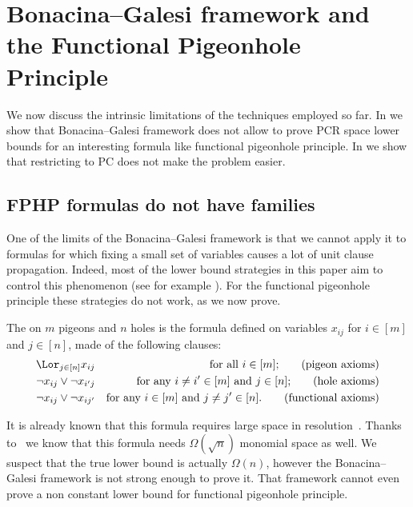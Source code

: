 \section{Bonacina--Galesi framework and the Functional Pigeonhole Principle}
\label{sec:limitations}

  We now discuss the intrinsic limitations of the techniques employed
  so far. In  we show that
  Bonacina--Galesi framework does not allow to prove PCR space lower
  bounds for an interesting formula like functional pigeonhole
  principle. In  we show that
  restricting to PC does not make the problem easier.

\subsection{FPHP formulas do not have \KextendibleNok families}
\label{sec:fphp-no-kextendible}

One of the limits of the Bonacina--Galesi framework is that we cannot
apply it to formulas for which fixing a small set of variables causes
a lot of unit clause propagation. Indeed, most of the lower bound
strategies in this paper aim to control this phenomenon (see for
example ). For the functional pigeonhole
principle these strategies do not work, as we now prove.


\begin{definition}\label{def:fphpformula}
  The  on $m$ pigeons and $n$ holes is the formula defined on variables $x_{ij}$ for $i\in[m]$ and $j\in[n]$, made of the following clauses:
  \begin{align}
    \Lor_{j\in[n]} x_{ij} && \text{for all $i\in[m]$;} \tag{pigeon axioms}\\
    \lnot{x_{ij}} \lor \lnot{x_{i'j}} && \text{for any
      $i\not=i'\in[m]$ and $j\in[n]$;} \tag{hole axioms}\\
    \lnot{x_{ij}} \lor \lnot{x_{ij'}} && \text{for any $i\in[m]$ and
      $j\not=j'\in[n]$.\tag{functional axioms}}
  \end{align}
\end{definition}

%

%
%
%
%
%

It is already known that this formula requires large space in
resolution~\cite{BW01ShortProofs,AD08CombinatoricalCharacterization}.
%
Thanks to~\cite{GKT19SpaceWidth} we know that this formula needs
$\Omega(\sqrt{n})$ monomial space as well.
%
We suspect that the true lower bound is actually $\Omega(n)$, however
the Bonacina--Galesi framework is not strong enough to prove it.
That framework cannot even prove a non constant lower bound for
functional pigeonhole principle.

